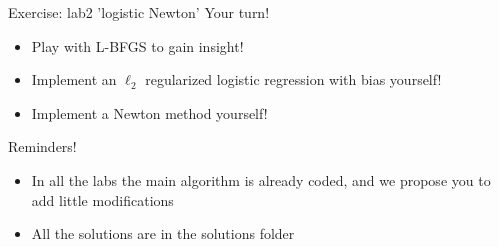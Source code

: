 \begin{frame}{Exercise: lab2 'logistic Newton'}
    Your turn!
    
    \begin{itemize}
        \item  Play with L-BFGS to gain insight! 
        \item Implement an $\ell_2$ regularized logistic regression with bias yourself!
        \item Implement a Newton method yourself!
    \end{itemize}
    
    \vspace{2em}
    
    Reminders! 
    \begin{itemize}
        \item In all the labs the main algorithm is already coded, and we propose you to add little modifications
        \item All the solutions are in the solutions folder
    \end{itemize}
\end{frame}
